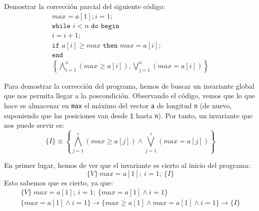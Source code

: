 \begin{ejercicio}
    Demostrar la corrección parcial del siguiente código:
    \begin{gather*}
        max = a[1]; i = 1; \\
        \texttt{while\ } i < n \texttt{\ do\ begin} \\
        i = i +1; \\
        \texttt{if\ } a[i] \geq max \texttt{\ then\ } max = a[i]; \\
        \texttt{end} \\
        \left\{\bigwedge_{i=1}^n (max \geq a[i]), \bigvee_{j=1}^n (max = a[i]) \right\}
    \end{gather*}

    Para demostrar la corrección del programa, hemos de buscar un invariante global que nos permita llegar a la poscondición. Observando el código, vemos que lo que hace es almacenar en \verb|max| el máximo del vector \verb|a| de longitud \verb|n| (de nuevo, suponiendo que las posiciones van desde \verb|1| hasta \verb|n|). Por tanto, un invariante que nos puede servir es:
    \begin{equation*}
        \{I\} \equiv \left\{\bigwedge_{j=1}^{i} (max \geq a[j]) \land \bigvee_{j=1}^{i} (max = a[j])\right\}
    \end{equation*}

    En primer lugar, hemos de ver que el invariante es cierto al inicio del programa:
    \begin{equation*}
        \{V\}\ max = a[1];\ i=1;\ \{I\}
    \end{equation*}
    Esto sabemos que es cierto, ya que:
    \begin{gather*}
        \{V\}\ max = a[1];\ i=1;\ \{max = a[1] \land i = 1\} \\
        \{max = a[1] \land i = 1\}\rightarrow \{max \geq a[1] \land max = a[1] \land i = 1\} \rightarrow \{I\}
    \end{gather*}


\end{ejercicio}
